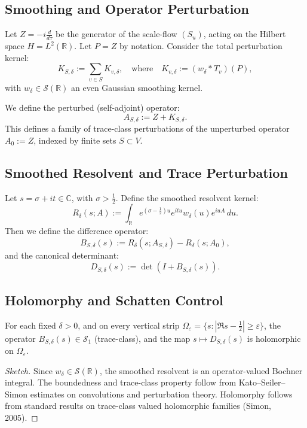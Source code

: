 \subsection{Smoothing and Operator Perturbation}

Let \( Z = -i \frac{d}{d\tau} \) be the generator of the scale-flow \( (S_u) \), acting on the Hilbert space \( H = L^2(\mathbb{R}) \). Let \( P = Z \) by notation. Consider the total perturbation kernel:
\[
K_{S,\delta} := \sum_{v \in S} K_{v,\delta}, \quad \text{where} \quad K_{v,\delta} := \left( w_\delta * T_v \right)(P),
\]
with \( w_\delta \in \mathcal{S}(\mathbb{R}) \) an even Gaussian smoothing kernel.

We define the perturbed (self-adjoint) operator:
\[
A_{S,\delta} := Z + K_{S,\delta}.
\]
This defines a family of trace-class perturbations of the unperturbed operator \( A_0 := Z \), indexed by finite sets \( S \subset V \).

\subsection{Smoothed Resolvent and Trace Perturbation}

Let \( s = \sigma + it \in \mathbb{C} \), with \( \sigma > \frac{1}{2} \). Define the smoothed resolvent kernel:
\[
R_\delta(s; A) := \int_{\mathbb{R}} e^{(\sigma - \frac{1}{2})u} e^{itu} w_\delta(u) e^{iuA} \, du.
\]
Then we define the difference operator:
\[
B_{S,\delta}(s) := R_\delta(s; A_{S,\delta}) - R_\delta(s; A_0),
\]
and the canonical determinant:
\[
D_{S,\delta}(s) := \det \left( I + B_{S,\delta}(s) \right).
\]

\subsection{Holomorphy and Schatten Control}

\begin{proposition}
For each fixed \( \delta > 0 \), and on every vertical strip \( \Omega_\varepsilon = \{ s : |\Re s - \frac{1}{2}| \geq \varepsilon \} \), the operator \( B_{S,\delta}(s) \in \mathcal{S}_1 \) (trace-class), and the map \( s \mapsto D_{S,\delta}(s) \) is holomorphic on \( \Omega_\varepsilon \).
\end{proposition}

\begin{proof}[Sketch]
Since \( w_\delta \in \mathcal{S}(\mathbb{R}) \), the smoothed resolvent is an operator-valued Bochner integral. The boundedness and trace-class property follow from Kato–Seiler–Simon estimates on convolutions and perturbation theory. Holomorphy follows from standard results on trace-class valued holomorphic families (Simon, 2005).
\end{proof}

